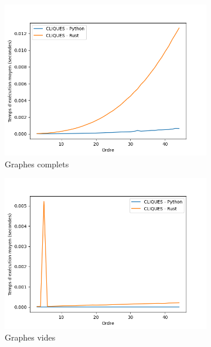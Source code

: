 \documentclass[12pt,a4paper]{article}
\begin{document}
\begin{figure}[ht]
  \centering
  \begin{subfigure}[b]{0.32\textwidth}
    \includegraphics[width=\textwidth]{images/total_CLIQUES_pyrust_pivot_complete_plot.png}
  \caption{Graphes complets}%
  \label{subfig:pr_cliques_complete}
  \end{subfigure}
  \begin{subfigure}[b]{0.32\textwidth}
    \includegraphics[width=\textwidth]{images/total_CLIQUES_pyrust_pivot_empty_plot.png}
  \caption{Graphes vides}%
  \label{subfig:pr_cliques_empty}
  \end{subfigure}
  \begin{subfigure}[b]{0.32\textwidth}

\end{subfigure}
\end{figure}
\end{document}
